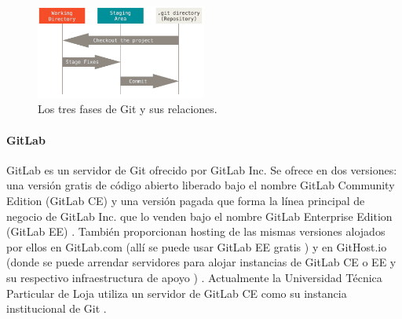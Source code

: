 \begin{figure}
  \begin{center}
      \includegraphics[width=0.5\textwidth]{Figures/git-fases.png}
  \end{center}
  \caption{Los tres fases de Git y sus relaciones. \citep{PROGIT-Git-Intro}}
  \label{Git-Fases}
\end{figure}

\paragraph{GitLab}
GitLab es un servidor de Git ofrecido por GitLab Inc. Se ofrece en dos versiones: una versión gratis \citep{GitLab-Products} de código abierto liberado bajo el nombre GitLab Community Edition (GitLab CE) y una versión pagada que forma la línea principal de negocio de GitLab Inc. que lo venden bajo el nombre GitLab Enterprise Edition (GitLab EE) \citep{GitLab-About}. También proporcionan hosting de las mismas versiones alojados por ellos en GitLab.com (allí se puede usar GitLab EE gratis \citep{GitLab-GitLab.com} \citep{GitLab-Products}) y en GitHost.io (donde se puede arrendar servidores para alojar instancias de GitLab CE o EE y su respectivo infraestructura de apoyo \citep{GitHost.io}) \citep{GitLab-About}. Actualmente la Universidad Técnica Particular de Loja utiliza un servidor de GitLab CE como su instancia institucional de Git \citep{UTPL-GitLab}.

